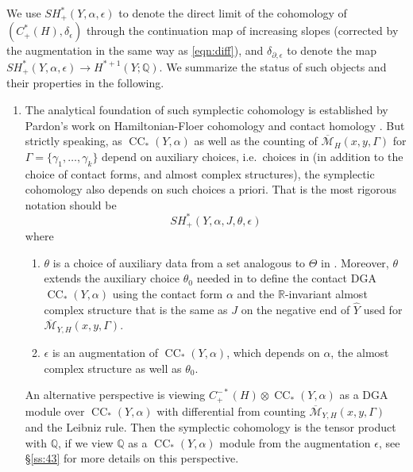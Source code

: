 \documentclass[reqno,11pt]{amsart}
\numberwithin{equation}{section}
\def\R{\mathbb{R}}
\def\Q{{\mathbb Q}}
\def\cM{{\mathcal M}}
\DeclareMathOperator{\CC}{CC}
\begin{document}
We use $SH^*_+(Y,\alpha,\epsilon)$ to denote the direct limit of the cohomology of $(C^*_+(H),\delta_{\epsilon})$ through the continuation map of increasing slopes (corrected by the augmentation in the same way as \eqref{eqn:diff}), and $\delta_{\partial,\epsilon}$ to denote the map $SH^*_+(Y,\alpha,\epsilon)\to H^{*+1}(Y;\Q)$. We summarize the status of such objects and their properties in the following.
\begin{enumerate}
    \item\label{1} The analytical foundation of such symplectic cohomology is established by Pardon's work on Hamiltonian-Floer cohomology \cite{zbMATH06578598} and contact homology \cite{zbMATH07085531}. But strictly speaking, as $\CC_*(Y,\alpha)$ as well as the counting of $\overline{\cM}_H(x,y,\Gamma)$ for $\Gamma=\{\gamma_1,\ldots,\gamma_k\}$ depend on auxiliary choices, i.e.\ choices in \cite[\S 4.8]{zbMATH07085531} (in addition to the choice of contact forms, and almost complex structures), the symplectic cohomology also depends on such choices a priori. That is the most rigorous notation should be 
    $$SH_+^*(Y,\alpha,J,\theta,\epsilon)$$
    where 
    \begin{enumerate}
        \item $\theta$ is a choice of auxiliary data from a set analogous to $\Theta$ in \cite[\S 4.8]{zbMATH07085531}. Moreover, $\theta$ extends the auxiliary choice $\theta_0$ needed in \cite[\S 4.8]{zbMATH07085531} to define the contact DGA $\CC_*(Y,\alpha)$ using the contact form $\alpha$ and the $\R$-invariant almost complex structure that is the same as $J$ on the negative end of $\widehat{Y}$ used for $\overline{\cM}_{Y,H}(x,y,\Gamma)$.
        \item $\epsilon$ is an augmentation of $\CC_*(Y,\alpha)$, which depends on $\alpha$, the almost complex structure as well as $\theta_0$.
    \end{enumerate}
    An alternative perspective is viewing $C^{-*}_+(H)\otimes \CC_*(Y,\alpha)$ as a DGA module over $\CC_*(Y,\alpha)$ with differential from counting $\overline{\cM}_{Y,H}(x,y,\Gamma)$ and the Leibniz rule. Then the symplectic cohomology is the tensor product with $\Q$, if we view $\Q$ as a $\CC_*(Y,\alpha)$ module from the augmentation $\epsilon$, see \S \ref{ss:43} for more details on this perspective.


\end{enumerate}
\end{document}
